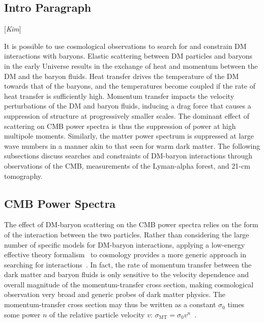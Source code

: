 \documentclass[12pt]{article}
\newcommand{\Contributors}[1]{ {\footnotesize [\textit{#1}]}}
\begin{document}
\subsection{Intro Paragraph}
\Contributors{Kim}

It is possible to use cosmological observations to search for and constrain DM interactions with baryons.
Elastic scattering between DM particles and baryons in the early Universe results in the exchange of heat and momentum between the DM and the baryon fluids.
Heat transfer drives the temperature of the DM towards that of the baryons, and the temperatures become coupled if the rate of heat transfer is sufficiently high.
Momentum transfer impacts the velocity perturbations of the DM and baryon fluids, inducing a drag force that causes a suppression of structure at progressively smaller scales.
The dominant effect of scattering on CMB power spectra is thus the suppression of power at high multipole moments.
Similarly, the matter power spectrum is suppressed at large wave numbers in a manner akin to that seen for warm dark matter.
The following subsections discuss searches and constraints of DM-baryon interactions through observations of the CMB, measurements of the Lyman-alpha forest, and 21-cm tomography.

\subsection{CMB Power Spectra}
The effect of DM-baryon scattering on the CMB power spectra relies on the form of the interaction between the two particles.
Rather than considering the large number of specific models for DM-baryon interactions, applying a low-energy effective theory formalism~\cite{Fan:2010gt,Fitzpatrick:2012ix,Anand:2013yka,Dent:2015zpa} to cosmology provides a more generic approach in searching for interactions~\cite{Boddy:2018kfv}.
In fact, the rate of momentum transfer between the dark matter and baryon fluids is only sensitive to the velocity dependence and overall magnitude of the momentum-transfer cross section, making cosmological observation very broad and generic probes of dark matter physics.
The momentum-transfer cross section may thus be written as a constant $\sigma_0$ times some power $n$ of the relative particle velocity $v$: $\sigma_\textrm{MT} = \sigma_0 v^n$~\cite{Dvorkin:2013cea}.
\end{document}
